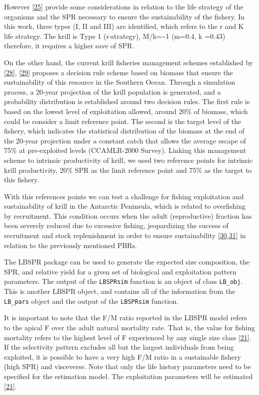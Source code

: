 \documentclass[
]{article}
\begin{document}
However {[}\protect\hyperlink{ref-Prince2014}{25}{]} provide some
considerations in relation to the life strategy of the organisms and the
SPR necessary to ensure the sustainability of the fishery. In this work,
three types (I, II and III) are identified, which refers to the r and K
life strategy. The krill is Type 1 (r-strategy), M/k=\textasciitilde1
(m=0.4, k =0.43) therefore, it requires a higher save of SPR.

On the other hand, the current krill fisheries management schemes
established by {[}\protect\hyperlink{ref-CCAMLR2010}{28}{]},
{[}\protect\hyperlink{ref-Constable2000}{29}{]} proposes a decision rule
scheme based on biomass that ensure the sustainability of this resource
in the Southern Ocean. Through a simulation process, a 20-year
projection of the krill population is generated, and a probability
distribution is established around two decision rules. The first rule is
based on the lowest level of exploitation allowed, around 20\% of
biomass, which could be consider a limit reference point. The second is
the target level of the fishery, which indicates the statistical
distribution of the biomass at the end of the 20-year projection under a
constant catch that allows the average escape of 75\% at pre-exploited
levels (CCAMLR-2000 Survey). Linking this management scheme to intrinsic
productivity of krill, we used two reference points for intrinsic krill
productivity, 20\% SPR as the limit reference point and 75\% as the
target to this fishery.

With this references points we can test a challenge for fishing
exploitation and sustainability of krill in the Antarctic Peninsula,
which is related to overfishing by recruitment. This condition occurs
when the adult (reproductive) fraction has been severely reduced due to
excessive fishing, jeopardizing the success of recruitment and stock
replenishment in order to ensure sustainability
{[}\protect\hyperlink{ref-Cubillos2005}{30},\protect\hyperlink{ref-HilbornWalters92}{31}{]}
in relation to the previously mentioned PBRs.

The LBSPR package can be used to generate the expected size composition,
the SPR, and relative yield for a given set of biological and
exploitation pattern parameters. The output of the \texttt{LBSPRsim}
function is an object of class \texttt{LB\_obj}. This is another LBSPR
object, and contains all of the information from the \texttt{LB\_pars}
object and the output of the \texttt{LBSPRsim} function.

It is important to note that the F/M ratio reported in the LBSPR model
refers to the apical F over the adult natural mortality rate. That is,
the value for fishing mortality refers to the highest level of F
experienced by any single size class
{[}\protect\hyperlink{ref-Hordyk2014c}{21}{]}. If the selectivity
pattern excludes all but the largest individuals from being exploited,
it is possible to have a very high F/M ratio in a sustainable fishery
(high SPR) and visceverse. Note that only the life history parameters
need to be specified for the estimation model. The exploitation
parameters will be estimated
{[}\protect\hyperlink{ref-Hordyk2014c}{21}{]}.
\end{document}
